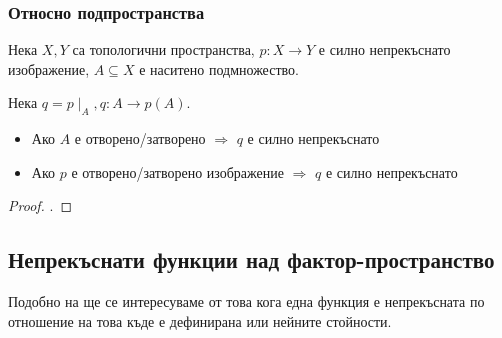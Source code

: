 \subsubsection{Относно подпространства}
\begin{theorem}
    Нека $X, Y$ са топологични пространства, $p: X \to Y$ е силно непрекъснато изображение, $A \subseteq X$ е наситено подмножество. 

    Нека $q = p\mid_A, q: A \to p(A)$.
    \begin{itemize}
        \item Ако $A$ е отворено/затворено $\Rightarrow$ $q$ е силно непрекъснато
        \item Ако $p$ е отворено/затворено изображение $\Rightarrow$ $q$ е силно непрекъснато
    \end{itemize}
\end{theorem}
\begin{proof}
    \cite[стр.~140]{munkrestopology}.
\end{proof}

\subsection{Непрекъснати функции над фактор-пространство}

Подобно на  ще се интересуваме от това кога една функция е непрекъсната по отношение на това къде е дефинирана или нейните стойности.


